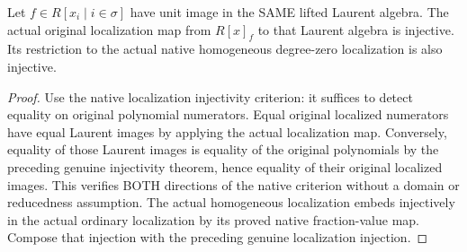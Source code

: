 \begin{lemma}
\label{lem:c0n-polynomial-localization-laurent-faithful}
\leanok
{}
Let $f\in R[x_i\mid i\in\sigma]$ have unit image in the SAME lifted
Laurent algebra. The actual original localization map from $R[x]_f$ to
that Laurent algebra is injective. Its restriction to the actual native
homogeneous degree-zero localization is also injective.
\end{lemma}
\begin{proof}
Use the native localization injectivity criterion: it suffices to detect
equality on original polynomial numerators. Equal original localized
numerators have equal Laurent images by applying the actual localization
map. Conversely, equality of those Laurent images is equality of the
original polynomials by the preceding genuine injectivity theorem, hence
equality of their original localized images. This verifies BOTH directions
of the native criterion without a domain or reducedness assumption.
The actual homogeneous localization embeds injectively in the actual
ordinary localization by its proved native fraction-value map. Compose
that injection with the preceding genuine localization injection.
\end{proof}
